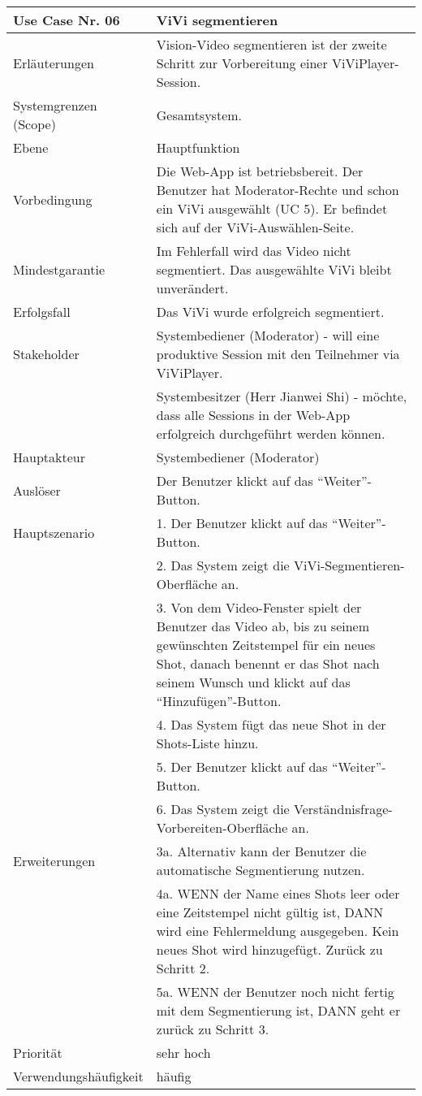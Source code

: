 \begin{tabularx}{\linewidth}{|l|X|}
	\hline
	Use Case Nr. 06			& \textbf{ViVi segmentieren} \\ \hline
	Erläuterungen			& Vision-Video segmentieren ist der zweite Schritt zur 
							  Vorbereitung einer ViViPlayer-Session. \\ \hline
	Systemgrenzen (Scope)	& Gesamtsystem. \\ \hline
	Ebene					& Hauptfunktion \\ \hline
	Vorbedingung			& Die Web-App ist betriebsbereit. Der Benutzer hat 
	                          Moderator-Rechte und schon ein ViVi ausgewählt (UC 5). Er  befindet sich auf der ViVi-Auswählen-Seite. \\ \hline
	Mindestgarantie			& Im Fehlerfall wird das Video nicht segmentiert. Das ausgewählte 
							  ViVi bleibt unverändert. \\ \hline
	Erfolgsfall 			& Das ViVi wurde erfolgreich segmentiert. \\ \hline
	Stakeholder				& Systembediener (Moderator) - will eine produktive Session mit den 
	                          Teilnehmer via ViViPlayer. \\
							& Systembesitzer (Herr Jianwei Shi) - möchte, dass alle Sessions 
							  in der Web-App erfolgreich durchgeführt werden können. \\ \hline
	Hauptakteur				& Systembediener (Moderator) \\ \hline
	Auslöser				& Der Benutzer klickt auf das ``Weiter''-Button. \\ \hline	
	Hauptszenario			& 1. Der Benutzer klickt auf das ``Weiter''-Button. \\
							& 2. Das System zeigt die ViVi-Segmentieren-Oberfläche an. \\
							& 3. Von dem Video-Fenster spielt der Benutzer das Video ab, bis 
							  zu seinem gewünschten Zeitstempel für ein neues Shot, danach 
							  benennt er das Shot nach seinem Wunsch und klickt auf das ``Hinzufügen''-Button. \\
							& 4. Das System fügt das neue Shot in der Shots-Liste 
							  hinzu. \\
							& 5. Der Benutzer klickt auf das ``Weiter''-Button. \\
							& 6. Das System zeigt die Verständnisfrage-Vorbereiten-Oberfläche 
							  an. \\ \hline
	Erweiterungen			& 3a. Alternativ kann der Benutzer die automatische 
							  Segmentierung nutzen. \\
							& 4a. WENN der Name eines Shots leer oder eine Zeitstempel 
							  nicht gültig ist, DANN wird eine Fehlermeldung ausgegeben. Kein neues Shot wird hinzugefügt. Zurück zu Schritt 2. \\ 
							& 5a. WENN der Benutzer noch nicht fertig mit dem Segmentierung 
							  ist, DANN geht er zurück zu Schritt 3. \\ \hline
	Priorität				& sehr hoch \\ \hline
	Verwendungshäufigkeit	& häufig \\ \hline
\end{tabularx}